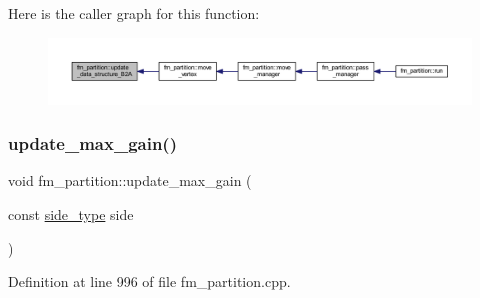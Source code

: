 Here is the caller graph for this function\+:\nopagebreak
\begin{figure}[H]
\begin{center}
\leavevmode
\includegraphics[width=350pt]{classfm__partition_a783174f29d49e7e1ae7f6cf71faa82fb_icgraph}
\end{center}
\end{figure}
\mbox{\label{classfm__partition_a335722b73c1d6f02d1083e76a3937b01}} 
\subsubsection{\texorpdfstring{update\+\_\+max\+\_\+gain()}{update\_max\_gain()}}
{\footnotesize\ttfamily void fm\+\_\+partition\+::update\+\_\+max\+\_\+gain (\begin{DoxyParamCaption}\item[{const \mbox{\hyperlink{classfm__partition_a7cdff1bea3740a287387e8408e16ca79}{side\+\_\+type}}}]{side }\end{DoxyParamCaption})\hspace{0.3cm}{\ttfamily [protected]}}



Definition at line 996 of file fm\+\_\+partition.\+cpp.


